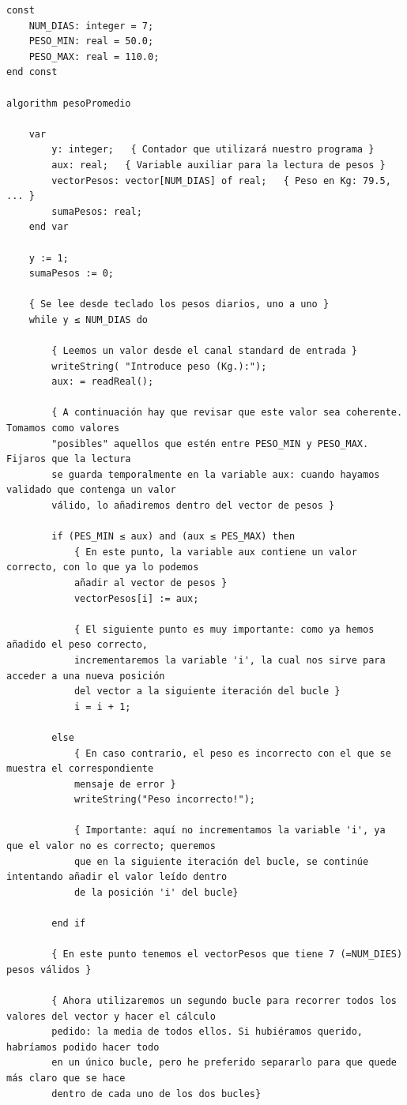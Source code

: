 \documentclass[
]{book}
\begin{document}
\begin{verbatim}
const
    NUM_DIAS: integer = 7;
    PESO_MIN: real = 50.0;
    PESO_MAX: real = 110.0;
end const

algorithm pesoPromedio

    var
        y: integer;   { Contador que utilizará nuestro programa }
        aux: real;   { Variable auxiliar para la lectura de pesos }
        vectorPesos: vector[NUM_DIAS] of real;   { Peso en Kg: 79.5, ... }
        sumaPesos: real;
    end var

    y := 1;
    sumaPesos := 0;

    { Se lee desde teclado los pesos diarios, uno a uno }
    while y ≤ NUM_DIAS do

        { Leemos un valor desde el canal standard de entrada }
        writeString( "Introduce peso (Kg.):");
        aux: = readReal();

        { A continuación hay que revisar que este valor sea coherente. Tomamos como valores
        "posibles" aquellos que estén entre PESO_MIN y PESO_MAX. Fijaros que la lectura
        se guarda temporalmente en la variable aux: cuando hayamos validado que contenga un valor
        válido, lo añadiremos dentro del vector de pesos }

        if (PES_MIN ≤ aux) and (aux ≤ PES_MAX) then
            { En este punto, la variable aux contiene un valor correcto, con lo que ya lo podemos
            añadir al vector de pesos }
            vectorPesos[i] := aux;

            { El siguiente punto es muy importante: como ya hemos añadido el peso correcto,
            incrementaremos la variable 'i', la cual nos sirve para acceder a una nueva posición
            del vector a la siguiente iteración del bucle }
            i = i + 1;

        else
            { En caso contrario, el peso es incorrecto con el que se muestra el correspondiente 
            mensaje de error }
            writeString("Peso incorrecto!");

            { Importante: aquí no incrementamos la variable 'i', ya que el valor no es correcto; queremos
            que en la siguiente iteración del bucle, se continúe intentando añadir el valor leído dentro
            de la posición 'i' del bucle}

        end if

        { En este punto tenemos el vectorPesos que tiene 7 (=NUM_DIES) pesos válidos }

        { Ahora utilizaremos un segundo bucle para recorrer todos los valores del vector y hacer el cálculo
        pedido: la media de todos ellos. Si hubiéramos querido, habríamos podido hacer todo
        en un único bucle, pero he preferido separarlo para que quede más claro que se hace
        dentro de cada uno de los dos bucles}


\end{verbatim}
\end{document}
